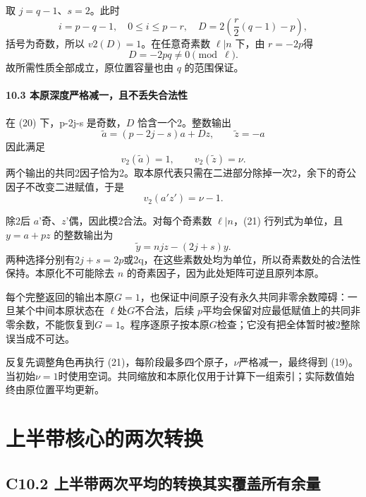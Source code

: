 \documentclass[11pt,a4paper]{article}
\theoremstyle{definition}
\numberwithin{equation}{section}
\begin{document}
{取} {\ensuremath{j=q-1}、\ensuremath{s=2}。此时} \[
i=p-q-1,\quad0\le i\le p-r,\quad
D=2\left(\frac r2(q-1)-p\right),
\] {括号为奇数，所以} {\ensuremath{v2(D)=1}。在任意奇素数} {\ensuremath{\ell |n}} {下，由} {\ensuremath{r=-2p}得} \[
D=-2pq\ne0\pmod\ell.
\] {故所需性质全部成立，原位置容量也由} {\ensuremath{q}} {的范围保证。}

\paragraph*{\texorpdfstring{{10.3} {本原深度严格减一，且不丢失合法性}}{10.3 本原深度严格减一，且不丢失合法性}}\label{C9-h73}

{在} {(20)} {下，p-2j-s} {是奇数，\ensuremath{D}} {恰含一个2。整数输出} \[
\widetilde a=(p-2j-s)a+Dz,\qquad
\widetilde z=-a
\] {因此满足} \[
v_2(\widetilde a)=1,\qquad
v_2(\widetilde z)=\nu.
\] {两个输出的共同2因子恰为2。取本原代表只需在二进部分除掉一次2，余下的奇公因子不改变二进赋值，于是} \[
\boxed{v_2(a'z')=\nu-1.}
\tag{C9.23}
\]

{除2后} {\ensuremath{a}'奇、\ensuremath{z}'偶，因此模2合法。对每个奇素数} {\ensuremath{\ell |n}，(21)} {行列式为单位，且} {\ensuremath{y=a+pz}} {的整数输出为} \[
\widetilde y=n jz-(2j+s)y.
\] {两种选择分别有\ensuremath{2j+s=2p}或2q，在这些素数处均为单位，所以奇素数处的合法性保持。本原化不可能除去} {\ensuremath{n}} {的奇素因子，因为此处矩阵可逆且原列本原。}

{每个完整返回的输出本原\ensuremath{G=1}，也保证中间原子没有永久共同非零余数障碍：一旦某个中间本原状态在} {\ensuremath{\ell }处\ensuremath{G}不合法，后续} {\ensuremath{p}平均会保留对应最低赋值上的共同非零余数，不能恢复到\ensuremath{G=1}。程序逐原子按本原\ensuremath{G}检查；它没有把全体暂时被2整除误当成不可达。}

{反复先调整角色再执行} {(21)，每阶段最多四个原子，\ensuremath{\nu }严格减一，最终得到} {(19)。当初始\ensuremath{\nu =1}时使用空词。共同缩放和本原化仅用于计算下一组索引；实际数值始终由原位置平均更新。}


\section{上半带核心的两次转换}\label{construct:common-shape}
\subsection*{\texorpdfstring{{C10.2} {上半带两次平均的转换其实覆盖所有余量}}{C10.2 上半带两次平均的转换其实覆盖所有余量}}\label{C10-h74}
\end{document}
